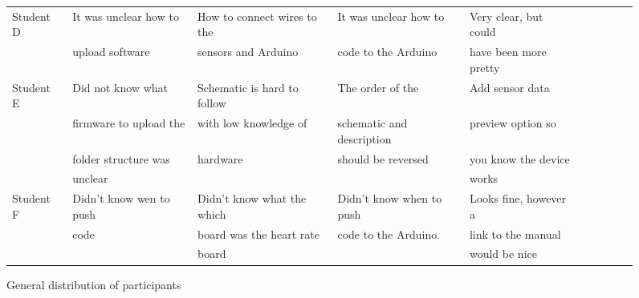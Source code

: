 \documentclass[conference]{IEEEtran}
\begin{document}
\begin{figure*}[ht]
\begin{tabular}{ | l | l | l | l | l | l | l | l | l | l | }
			Student D		& It was unclear how to 	& How to connect wires to the	& It was unclear how to 	& Very clear, but could	\\ 
							& upload software			& sensors and Arduino			& code to the Arduino		& have been more pretty	\\ \hline

			Student E		& Did not know what 		& Schematic is hard to follow	& The order of the 			& Add sensor data		\\ 
							& firmware to upload the	& with low knowledge of 		& schematic and description	& preview option so		\\ 
							& folder structure was 		& hardware						& should be reversed		& you know the device	\\ 
							& unclear					& 								& 							& works					\\ \hline
	
			Student F		& Didn't know wen to push	& Didn't know what the which	& Didn't know when to push	& Looks fine, however a	\\ 
							& code						& board was the heart rate 		& code to the Arduino.		& link to the manual	\\
							&  							& board							& 							& would be nice			\\ \hline
			\end{tabular}
			\caption{General distribution of participants}
		\end{figure*}
\end{document}
